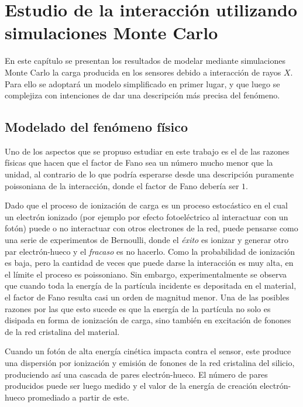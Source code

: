 \chapter{Estudio de la interacción utilizando simulaciones Monte Carlo \label{chap:simulaciones}}
\noindent En este capítulo se presentan los resultados de modelar mediante simulaciones Monte Carlo la carga producida en los sensores debido a interacción de rayos $X$. Para ello se adoptará un modelo simplificado en primer lugar, y que luego se complejiza con intenciones de dar una descripción más precisa del fenómeno.


\section{Modelado del fenómeno físico}
\noindent Uno de los aspectos que se propuso estudiar en este trabajo es el de las razones físicas que hacen que el factor de Fano sea un número mucho menor que la unidad, al contrario de lo que podría esperarse desde una descripción puramente poissoniana de la interacción, donde el factor de Fano debería ser $1$.

Dado que el proceso de ionización de carga es un proceso estocástico en el cual un electrón ionizado (por ejemplo por efecto fotoeléctrico al interactuar con un fotón) puede o no interactuar con otros electrones de la red, puede pensarse como una serie de experimentos de Bernoulli, donde el \textit{éxito} es ionizar y generar otro par electrón-hueco y el \textit{fracaso} es no hacerlo. Como la probabilidad de ionización es baja, pero la cantidad de veces que puede darse la interacción es muy alta, en el límite el proceso es poissoniano. Sin embargo, experimentalmente se observa que cuando toda la energía de la partícula incidente es depositada en el material, el factor de Fano resulta casi un orden de magnitud menor\cite{TesisKevin}. Una de las posibles razones por las que esto sucede es que la energía de la partícula no solo es disipada en forma de ionización de carga, sino también en excitación de fonones de la red cristalina del material.

Cuando un fotón de alta energía cinética impacta contra el sensor, este produce una dispersión por ionización y emisión de fonones de la red cristalina del silicio, produciendo así una cascada de pares electrón-hueco. El número de pares producidos puede ser luego medido y el valor de la energía de creación electrón-hueco promediado a partir de este.

